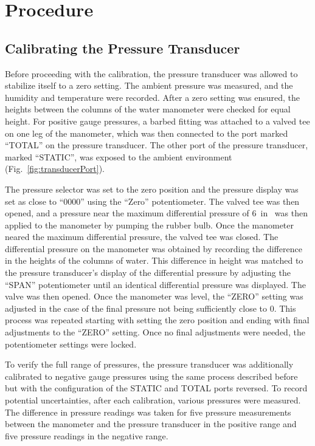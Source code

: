 \documentclass[journal,letterpaper]{IEEEtran}
\begin{document}
\section{Procedure}

\subsection{Calibrating the Pressure Transducer}

Before proceeding with the calibration, the pressure transducer was allowed to stabilize itself to a zero setting.
The ambient pressure was measured, and the humidity and temperature were recorded.
After a zero setting was ensured, the heights between the columns of the water manometer were checked for equal height.
For positive gauge pressures, a barbed fitting was attached to a valved tee on one leg of the manometer, which was then connected to the port marked “TOTAL” on the pressure transducer.
The other port of the pressure transducer, marked “STATIC”, was exposed to the ambient environment (Fig.~\ref{fig:transducerPort}).

The pressure selector was set to the zero position and the pressure display was set as close to “0000” using the “Zero” potentiometer.
The valved tee was then opened, and a pressure near the maximum differential pressure of \qty{6}{in} was then applied to the manometer by pumping the rubber bulb.
Once the manometer neared the maximum differential pressure, the valved tee was closed.
The differential pressure on the manometer was obtained by recording the difference in the heights of the columns of water.
This difference in height was matched to the pressure transducer's display of the differential pressure by adjusting the “SPAN” potentiometer until an identical differential pressure was displayed.
The valve was then opened.
Once the manometer was level, the “ZERO” setting was adjusted in the case of the final pressure not being sufficiently close to 0.
This process was repeated starting with setting the zero position and ending with final adjustments to the “ZERO” setting.
Once no final adjustments were needed, the potentiometer settings were locked.

To verify the full range of pressures, the pressure transducer was additionally calibrated to negative gauge pressures using the same process described before but with the configuration of the STATIC and TOTAL ports reversed.
To record potential uncertainties, after each calibration, various pressures were measured.
The difference in pressure readings was taken for five pressure measurements between the manometer and the pressure transducer in the positive range and five pressure readings in the negative range.
\end{document}
